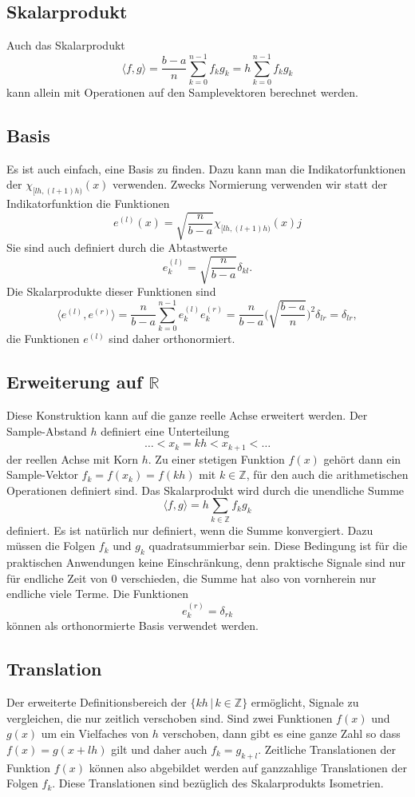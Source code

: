\subsection{Skalarprodukt
\label{haar:subsection:skalarprodukt}}
Auch das Skalarprodukt 
\[
\langle f,g\rangle
=
\frac{b-a}{n}
\sum_{k=0}^{n-1} f_k g_k
=
h
\sum_{k=0}^{n-1} f_k g_k
\]
kann allein mit Operationen auf den Samplevektoren berechnet werden.

\subsection{Basis
\label{haar:subsection:basis}}
Es ist auch einfach, eine Basis zu finden.
Dazu kann man die Indikatorfunktionen der $\chi_{[lh,(l+1)h)}(x)$
verwenden.
Zwecks Normierung verwenden wir statt der Indikatorfunktion die
Funktionen
\[
e^{(l)}(x) = \sqrt{\frac{n}{b-a}}\chi_{[lh,(l+1)h)}(x)j
\]
Sie sind auch definiert durch die Abtastwerte
\[
e_k^{(l)} = \sqrt{\frac{n}{b-a}}\delta_{kl}.
\]
Die Skalarprodukte dieser Funktionen sind
\[
\langle e^{(l)}, e^{(r)}\rangle
=
\frac{n}{b-a}
\sum_{k=0}^{n-1} e^{(l)}_k e^{(r)}_k
=
\frac{n}{b-a}
\biggl(\sqrt{\frac{b-a}{n}}\biggr)^2 \delta_{lr}
=
\delta_{lr},
\]
die Funktionen $e^{(l)}$ sind daher orthonormiert.

\subsection{Erweiterung auf $\mathbb R$}
Diese Konstruktion kann auf die ganze reelle Achse erweitert werden.
Der Sample-Abstand $h$ definiert eine Unterteilung
\[
\dots < x_{k} = kh < x_{k+1} < \dots
\]
der reellen Achse mit Korn $h$.
Zu einer stetigen Funktion $f(x)$ gehört dann ein Sample-Vektor
$f_k=f(x_k)=f(kh)$ mit $k\in\mathbb Z$, für den auch die
arithmetischen Operationen definiert sind.
Das Skalarprodukt wird durch die unendliche Summe
\[
\langle f, g\rangle
=
h
\sum_{k\in\mathbb Z} f_k g_k
\]
definiert.
Es ist natürlich nur definiert, wenn die Summe konvergiert.
Dazu müssen die Folgen $f_k$ und $g_k$ quadratsummierbar sein.
Diese Bedingung ist für die praktischen Anwendungen keine Einschränkung,
denn praktische Signale sind nur für endliche Zeit von $0$ verschieden,
die Summe hat also von vornherein nur endliche viele Terme.
Die Funktionen
\[
e^{(r)}_k = \delta_{rk}
\]
können als orthonormierte Basis verwendet werden.

\subsection{Translation
\label{haar:subsection:translation}}
Der erweiterte Definitionsbereich der $\{kh\,|\,k\in\mathbb Z\}$ ermöglicht,
Signale zu vergleichen, die nur zeitlich verschoben sind.
Sind zwei Funktionen $f(x)$ und $g(x)$ um ein Vielfaches von $h$ verschoben,
dann gibt es eine ganze Zahl so dass $f(x)=g(x+lh)$ gilt und daher auch
$f_k = g_{k+l}$.
Zeitliche Translationen der Funktion $f(x)$ können also abgebildet
werden auf ganzzahlige Translationen der Folgen $f_k$.
Diese Translationen sind bezüglich des Skalarprodukts Isometrien.

